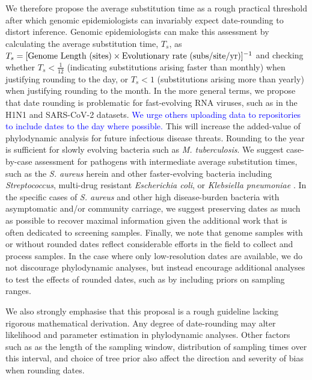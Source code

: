 \documentclass[12pt]{article}
\begin{document}
\begin{spacing}{2}
 We therefore propose the average substitution time as a rough practical threshold after which genomic epidemiologists can invariably expect date-rounding to distort inference. Genomic epidemiologists can make this assessment by calculating the average substitution time, $T_s$, as $T_s = [\textnormal{Genome Length (sites)}\times\textnormal{Evolutionary rate (subs/site/yr)}]^{-1}$ and checking whether $T_s < \frac{1}{12}$ (indicating substitutions arising faster than monthly) when justifying rounding to the day, or $T_s < 1$ (substitutions arising more than yearly) when justifying rounding to the month. In the more general terms, we propose that date rounding is problematic for fast-evolving RNA viruses, such as in the H1N1 and SARS-CoV-2 datasets. \textcolor{blue}{We urge others uploading data to repositories to include dates to the day where possible.} This will increase the added-value of phylodynamic analysis for future infectious disease threats. Rounding to the year is sufficient for slowly evolving bacteria such as \textit{M. tuberculosis}. We suggest case-by-case assessment for pathogens with intermediate average substitution times, such as the \textit{S. aureus} herein and other faster-evolving bacteria including \textit{Streptococcus}, multi-drug resistant \textit{Escherichia coli}, or \textit{Klebsiella pneumoniae} \citep{gorrie_antimicrobial-resistant_2018,sherry_multi-site_2022,xie_temporal_2024}. In the specific cases of \textit{S. aureus} and other high disease-burden bacteria with asymptomatic and/or community carriage, we suggest preserving dates as much as possible to recover maximal information given the additional work that is often dedicated to screening samples. Finally, we note that genome samples with or without rounded dates reflect considerable efforts in the field to collect and process samples. In the case where only low-resolution dates are available, we do not discourage phylodynamic analyses, but instead encourage additional analyses to test the effects of rounded dates, such as by including priors on sampling ranges.

 We also strongly emphasise that this proposal is a rough guideline lacking rigorous mathematical derivation. Any degree of date-rounding may alter likelihood and parameter estimation in phylodynamic analyses. Other factors such as as the length of the sampling window, distribution of sampling times over this interval, and choice of tree prior also affect the direction and severity of bias when rounding dates.  


\end{spacing}
\end{document}
